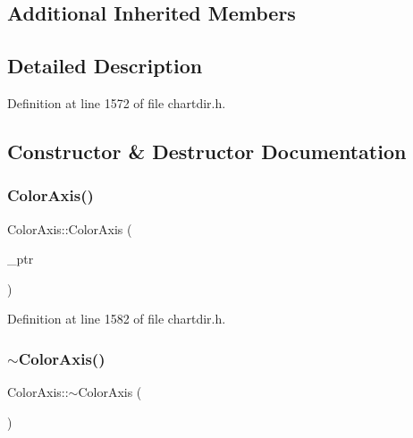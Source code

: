 \subsection*{Additional Inherited Members}


\subsection{Detailed Description}


Definition at line 1572 of file chartdir.\+h.



\subsection{Constructor \& Destructor Documentation}
\mbox{\label{class_color_axis_ab0eedd68ce592921fec66c44be262a94}} 
\subsubsection{\texorpdfstring{Color\+Axis()}{ColorAxis()}}
{\footnotesize\ttfamily Color\+Axis\+::\+Color\+Axis (\begin{DoxyParamCaption}\item[{Color\+Axis\+Internal $\ast$}]{\+\_\+ptr }\end{DoxyParamCaption})\hspace{0.3cm}{\ttfamily [inline]}}



Definition at line 1582 of file chartdir.\+h.

\mbox{\label{class_color_axis_a532bc8d05b8a461eaba37f505d79b5ac}} 
\subsubsection{\texorpdfstring{$\sim$\+Color\+Axis()}{~ColorAxis()}}
{\footnotesize\ttfamily Color\+Axis\+::$\sim$\+Color\+Axis (\begin{DoxyParamCaption}{ }\end{DoxyParamCaption})\hspace{0.3cm}{\ttfamily [inline]}}



